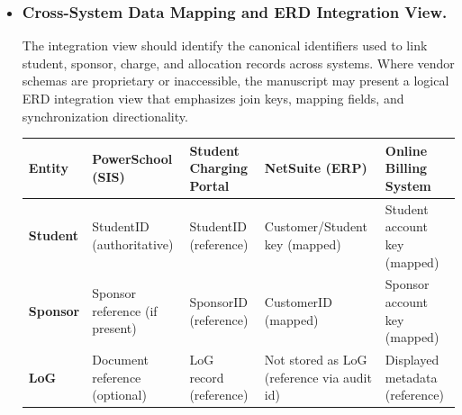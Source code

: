 \begin{itemize}
            \item \subsubsection{Cross-System Data Mapping and ERD Integration View.} The integration view should identify the canonical identifiers used to link student, sponsor, charge, and allocation records across systems. Where vendor schemas are proprietary or inaccessible, the manuscript may present a logical ERD integration view that emphasizes join keys, mapping fields, and synchronization directionality.

            \begin{center}
            \captionsetup{type=table}
            \caption{Logical cross-system entity mapping and key identifiers}
            \label{table:role-functions}
            \smalltable
            \scriptsize
            \begin{tabular}{|>{\raggedright\arraybackslash}p{2.6cm}|
                            >{\raggedright\arraybackslash}p{1.8cm}|
                            >{\raggedright\arraybackslash}p{2.6cm}|
                            >{\raggedright\arraybackslash}p{2.6cm}|
                            >{\raggedright\arraybackslash}p{2.6cm}|}
            \hline
            \textbf{Entity}&
            \textbf{PowerSchool (SIS)}&
            \textbf{Student Charging Portal}&
            \textbf{NetSuite (ERP)}&
            \textbf{Online Billing System}
            \\
            \hline\hline
            
            \textbf{Student}&
            StudentID (authoritative)&
            StudentID (reference)&
            Customer/Student key (mapped)&
            Student account key (mapped)
            \\
            \hline
            
            \textbf{Sponsor}&
            Sponsor reference (if present)&
            SponsorID (reference)&
            CustomerID (mapped)&
            Sponsor account key (mapped)
            \\
            \hline
            
            \textbf{LoG}&
            Document reference (optional)&
            LoG record (reference)&
            Not stored as LoG (reference via audit id)&
            Displayed metadata (reference)
            \\
            \hline
            

\end{tabular}
\end{center}
\end{itemize}
